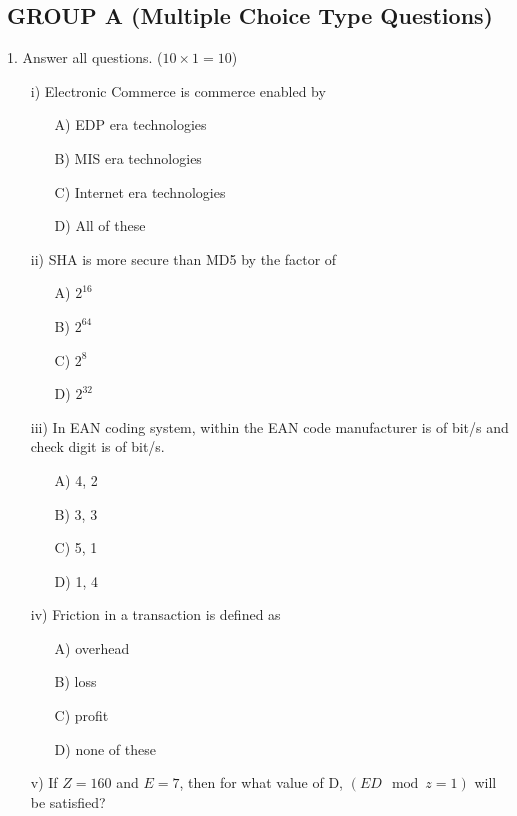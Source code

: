 \documentclass{article}
\begin{document}
\subsection*{GROUP A (Multiple Choice Type Questions)}
1. Answer all questions. ($10 \times 1 = 10$)
\begin{enumerate}
    \item[i)] Electronic Commerce is commerce enabled by
    \begin{enumerate}
        \item[A)] EDP era technologies
        \item[B)] MIS era technologies
        \item[C)] Internet era technologies
        \item[D)] All of these
    \end{enumerate}
    \item[ii)] SHA is more secure than MD5 by the factor of
    \begin{enumerate}
        \item[A)] $2^{16}$
        \item[B)] $2^{64}$
        \item[C)] $2^{8}$
        \item[D)] $2^{32}$
    \end{enumerate}
    \item[iii)] In EAN coding system, within the EAN code manufacturer is of \underline{\hspace{1cm}} bit/s and check digit is of \underline{\hspace{1cm}} bit/s.
    \begin{enumerate}
        \item[A)] 4, 2
        \item[B)] 3, 3
        \item[C)] 5, 1
        \item[D)] 1, 4
    \end{enumerate}
    \item[iv)] Friction in a transaction is defined as
    \begin{enumerate}
        \item[A)] overhead
        \item[B)] loss
        \item[C)] profit
        \item[D)] none of these
    \end{enumerate}
    \item[v)] If $Z=160$ and $E=7$, then for what value of D, $(ED \mod z = 1)$ will be satisfied?

\end{enumerate}
\end{document}
